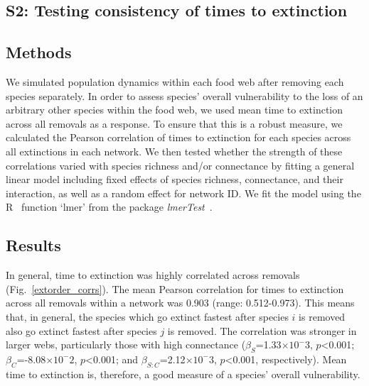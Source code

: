 \documentclass[12pt]{article}
\begin{document}
\begin{spacing}{2.0}
\clearpage


\section*{S2: Testing consistency of times to extinction}

	\subsection*{Methods}

		We simulated population dynamics within each food web after removing each species separately. 
		In order to assess species' overall vulnerability to the loss of an arbitrary other species within the food web, we used mean time to extinction across all removals as a response. 
		To ensure that this is a robust measure, we calculated the Pearson correlation of times to extinction for each species across all extinctions in each network. 
		We then tested whether the strength of these correlations varied with species richness and/or connectance by fitting a general linear model including fixed effects of species richness, connectance, and their interaction, as well as a random effect for network ID. 
		We fit the model using the R~\citep{R} function `lmer' from the package \emph{lmerTest}~\citep{lmerTest}.


	\subsection*{Results}

		In general, time to extinction was highly correlated across removals (Fig.~\ref{extorder_corrs}). %
		The mean Pearson correlation for times to extinction across all removals within a network was 0.903 (range: 0.512-0.973). %
		This means that, in general, the species which go extinct fastest after species $i$ is removed also go extinct fastest after species $j$ is removed.
		The correlation was stronger in larger webs, particularly those with high connectance ($\beta_{S}$=1.33$\times10^-3$, $p$\textless0.001; $\beta_{C}$=-8.08$\times10^-2$, $p$\textless0.001; and $\beta_{S:C}$=2.12$\times10^-3$, $p$\textless0.001, respectively). 
		Mean time to extinction is, therefore, a good measure of a species' overall vulnerability.



\end{spacing}
\end{document}
